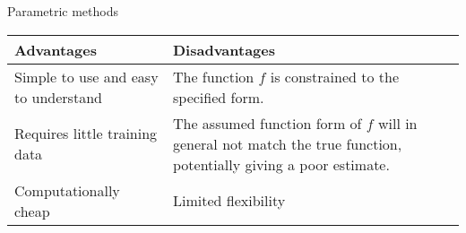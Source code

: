 \documentclass[ignorenonframetext,]{beamer}
\begin{document}
\begin{frame}

\begin{block}{Parametric methods}

\begin{longtable}[]{@{}ll@{}}
\toprule
\begin{minipage}[b]{0.47\columnwidth}\raggedright
Advantages\strut
\end{minipage} & \begin{minipage}[b]{0.47\columnwidth}\raggedright
Disadvantages\strut
\end{minipage}\tabularnewline
\midrule
\endhead
\begin{minipage}[t]{0.47\columnwidth}\raggedright
Simple to use and easy to understand\strut
\end{minipage} & \begin{minipage}[t]{0.47\columnwidth}\raggedright
The function \(f\) is constrained to the specified
form.\vspace{2mm}\strut
\end{minipage}\tabularnewline
\begin{minipage}[t]{0.47\columnwidth}\raggedright
Requires little training data\strut
\end{minipage} & \begin{minipage}[t]{0.47\columnwidth}\raggedright
The assumed function form of \(f\) will in general not match the true
function, potentially giving a poor estimate.\vspace{2mm}\strut
\end{minipage}\tabularnewline
\begin{minipage}[t]{0.47\columnwidth}\raggedright
Computationally cheap\strut
\end{minipage} & \begin{minipage}[t]{0.47\columnwidth}\raggedright
Limited flexibility\strut
\end{minipage}\tabularnewline
\bottomrule
\end{longtable}

\end{block}

\end{frame}
\end{document}
